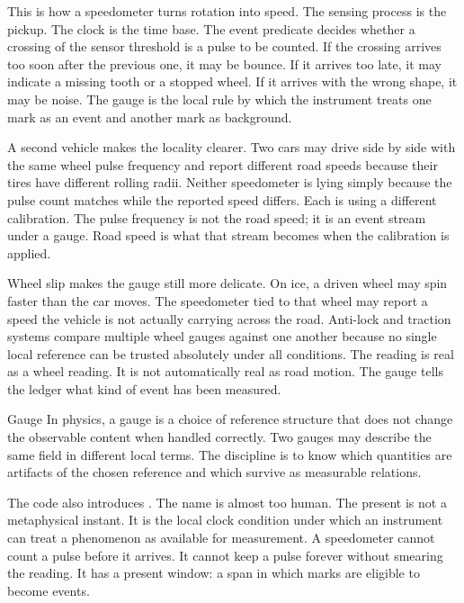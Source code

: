 This is how a speedometer turns rotation into speed. The sensing process is
the pickup. The clock is the time base. The event predicate decides whether a
crossing of the sensor threshold is a pulse to be counted. If the crossing
arrives too soon after the previous one, it may be bounce. If it arrives too
late, it may indicate a missing tooth or a stopped wheel. If it arrives with
the wrong shape, it may be noise. The gauge is the local rule by which the
instrument treats one mark as an event and another mark as background.

A second vehicle makes the locality clearer. Two cars may drive side by side
with the same wheel pulse frequency and report different road speeds because
their tires have different rolling radii. Neither speedometer is lying simply
because the pulse count matches while the reported speed differs. Each is
using a different calibration. The pulse frequency is not the road speed; it is
an event stream under a gauge. Road speed is what that stream becomes when the
calibration is applied.

Wheel slip makes the gauge still more delicate. On ice, a driven wheel may
spin faster than the car moves. The speedometer tied to that wheel may report a
speed the vehicle is not actually carrying across the road. Anti-lock and
traction systems compare multiple wheel gauges against one another because no
single local reference can be trusted absolutely under all conditions. The
reading is real as a wheel reading. It is not automatically real as road
motion. The gauge tells the ledger what kind of event has been measured.

\begin{sidebar}{Gauge}
\label{sb:gauge}
In physics, a gauge is a choice of reference structure that does not change the
observable content when handled correctly. Two gauges may describe the same
field in different local terms. The discipline is to know which quantities are
artifacts of the chosen reference and which survive as measurable relations.
\end{sidebar}

The code also introduces . The name is almost too human. The
present is not a metaphysical instant. It is the local clock condition under
which an instrument can treat a phenomenon as available for measurement. A
speedometer cannot count a pulse before it arrives. It cannot keep a pulse
forever without smearing the reading. It has a present window: a span in which
marks are eligible to become events.

